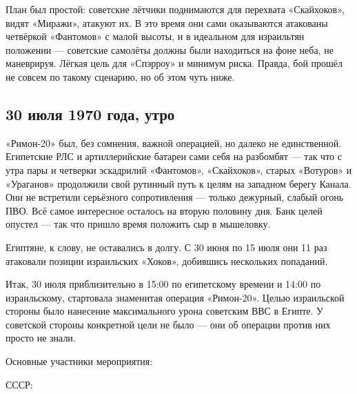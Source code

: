 План был простой: советские лётчики поднимаются для перехвата «Скайхоков», видят «Миражи», атакуют их. В это время они сами оказываются атакованы четвёркой «Фантомов» с малой высоты, и в идеальном для израильтян положении — советские самолёты должны были находиться на фоне неба, не маневрируя. Лёгкая цель для «Спэрроу» и минимум риска. Правда, бой прошёл не совсем по такому сценарию, но об этом чуть ниже.

\subsection{30 июля 1970 года, утро}

«Римон-20» был, без сомнения, важной операцией, но далеко не единственной. Египетские РЛС и артиллерийские батареи сами себя на разбомбят — так что с утра пары и четверки эскадрилий «Фантомов», «Скайхоков», старых «Вотуров» и «Ураганов» продолжили свой рутинный путь к целям на западном берегу Канала. Они не встретили серьёзного сопротивления — только дежурный, слабый огонь ПВО. Всё самое интересное осталось на вторую половину дня. Банк целей опустел — так что пришло время положить сыр в мышеловку.

Египтяне, к слову, не оставались в долгу. С 30 июня по 15 июля они 11 раз атаковали позиции израильских «Хоков», добившись нескольких попаданий.

Итак, 30 июля приблизительно в 15:00 по египетскому времени и 14:00 по израильскому, стартовала знаменитая операция «Римон-20». Целью израильской стороны было нанесение максимального урона советским ВВС в Египте. У советской стороны конкретной цели не было — они об операции против них просто не знали.

Основные участники мероприятия:

СССР:

